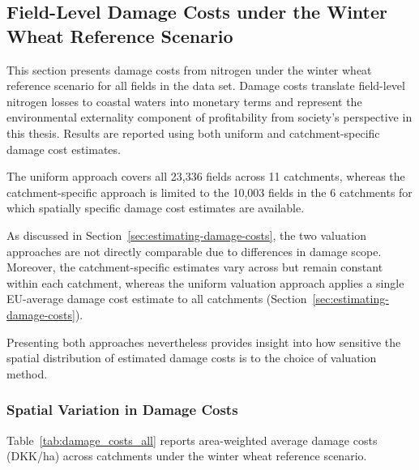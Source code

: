 \documentclass[12pt]{article}
\begin{document}
\subsection{Field-Level Damage Costs under the Winter Wheat Reference Scenario} 
\label{sec:field-level-damage-costs}

This section presents damage costs from nitrogen under the winter wheat reference scenario for all fields in the data set. Damage costs translate field-level nitrogen losses to coastal waters into monetary terms and represent the environmental externality component of profitability from society's perspective in this thesis. 
Results are reported using both uniform and catchment-specific damage cost estimates. 

The uniform approach covers all 23,336 fields across 11 catchments, whereas the catchment-specific approach is limited to the 10,003 fields in the 6 catchments for which spatially specific damage cost estimates are available. 


As discussed in Section~\ref{sec:estimating-damage-costs}, the two valuation approaches are not directly comparable due to differences in damage scope. Moreover, the catchment-specific estimates vary across but remain constant within each catchment, whereas the uniform valuation approach applies a single EU-average damage cost estimate to all catchments (Section~\ref{sec:estimating-damage-costs}).

Presenting both approaches nevertheless provides insight into how sensitive the spatial distribution of estimated damage costs is to the choice of valuation method.

\subsubsection{Spatial Variation in Damage Costs} 

Table~\ref{tab:damage_costs_all} reports area-weighted average damage costs (DKK/ha) across catchments under the winter wheat reference scenario. 
\end{document}
